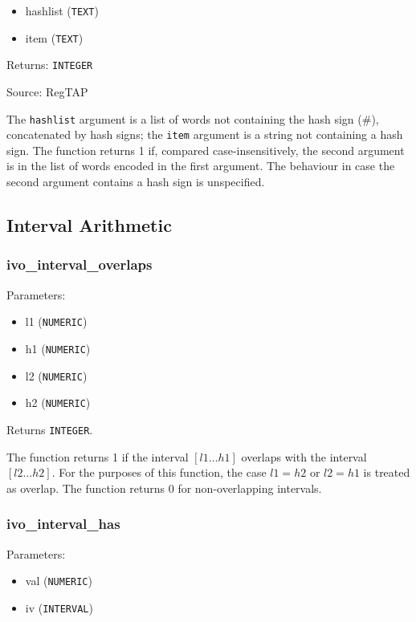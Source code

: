 \documentclass[11pt,a4paper]{ivoa}
\begin{document}
\begin{itemize}
	\item hashlist (\texttt{TEXT})
	\item item (\texttt{TEXT})
\end{itemize}

Returns: \texttt{INTEGER}

Source: RegTAP \citep{2014ivoa.spec.1208D}

The \texttt{hashlist} argument is a list of words not containing the hash
sign (\#), concatenated by hash signs; the \texttt{item} argument is
a string not containing a hash sign. The function
returns 1 if, compared case-insensitively,
the second argument is in the list of words encoded in the first argument.
The behaviour in case the second argument contains a hash sign is
unspecified.

\subsection{Interval Arithmetic}

\subsubsection{ivo\_interval\_overlaps}

Parameters:

\begin{itemize}
	\item l1 (\texttt{NUMERIC})
	\item h1 (\texttt{NUMERIC})
	\item l2 (\texttt{NUMERIC})
	\item h2 (\texttt{NUMERIC})
\end{itemize}

Returns \texttt{INTEGER}.

The function returns 1 if the interval $[l1\ldots h1]$ overlaps with the
interval $[l2\ldots h2]$. For the purposes of this function, the case
$l1=h2$ or
$l2=h1$ is treated as overlap. The function returns 0 for non-overlapping
intervals.

\subsubsection{ivo\_interval\_has}

Parameters:

\begin{itemize}
	\item val (\texttt{NUMERIC})
	\item iv (\texttt{INTERVAL})
\end{itemize}
\end{document}
